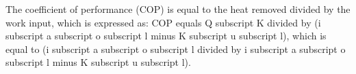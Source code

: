 The coefficient of performance (COP) is equal to the heat removed divided by the work input, which is expressed as:  
COP equals Q subscript K divided by (i subscript a subscript o subscript l minus K subscript u subscript l), which is equal to (i subscript a subscript o subscript l divided by i subscript a subscript o subscript l minus K subscript u subscript l).